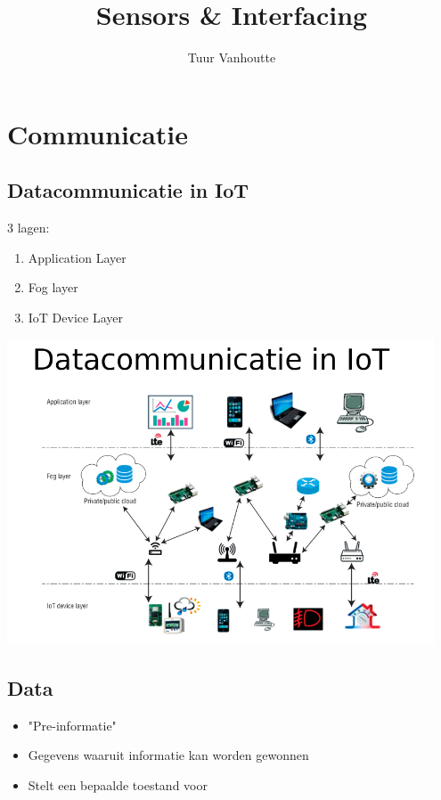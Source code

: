 \documentclass{article}
\begin{document}
\begin{titlepage}
    \author{Tuur Vanhoutte}
    \title{Sensors \& Interfacing}
\end{titlepage}

\maketitle
\newpage
\tableofcontents
\newpage


\section {Communicatie}
\subsection{Datacommunicatie in IoT}
3 lagen:
\begin{enumerate}
    \item Application Layer
    \item Fog layer
    \item IoT Device Layer
\end{enumerate}

\includegraphics[width=0.95\textwidth]{Screenshot_20200210_120010.png}

\subsection{Data}
\begin{itemize}
    \item "Pre-informatie"
    \item Gegevens waaruit informatie kan worden gewonnen
    \item Stelt een bepaalde toestand voor
\end{itemize}
\end{document}
